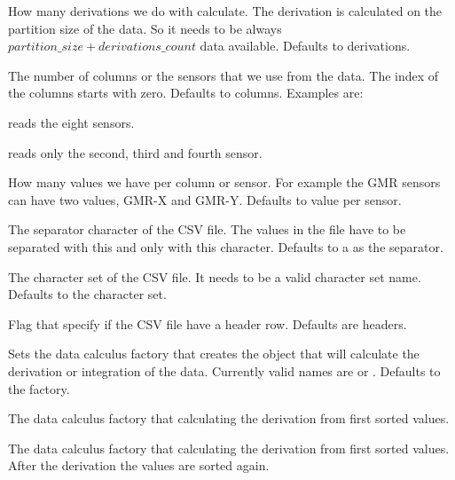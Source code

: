 How many derivations we do with calculate. The derivation is calculated on
the partition size of the data. So it
needs to be always $partition\_size + derivations\_count$ data
available. Defaults to  derivations.

\label{par:csvfile_columns}

The number of columns or the sensors that we use from the data. The index of
the columns starts with zero. Defaults to  columns.
Examples are:
\begin{compactitem}
\item {} reads the eight sensors.
\item {} reads only the second, third and fourth sensor.
\end{compactitem}

\label{par:csvfile_values_per_column}

How many values we have per column or sensor. For example the GMR sensors can
have two values, GMR-X and GMR-Y. Defaults to  value per sensor.

\label{par:csvfile_separator}

The separator character of the CSV file. The values in the file have to be
separated with this and only with this character.
Defaults to a  as the separator.

\label{par:csvfile_charset}

The character set of the CSV file. It needs to be a valid character set name.
Defaults to the  character set.

\label{par:csvfile_headers}

Flag that specify if the CSV file have a header row.
Defaults are  headers.

\label{par:csvfile_data_calculus_factory}

Sets the data calculus factory that creates the object that will
calculate the derivation or integration of the data. Currently valid names are
 or .
Defaults to the  factory.

\begin{asparadesc}
\item[\codequoted{sortedDerivationFactory}]
The data calculus factory that calculating the derivation from first sorted
values.
\item[\codequoted{sortedSortedDerivationFactory}]
The data calculus factory that calculating the derivation from first sorted
values. After the derivation the values are sorted again.
\end{asparadesc}

